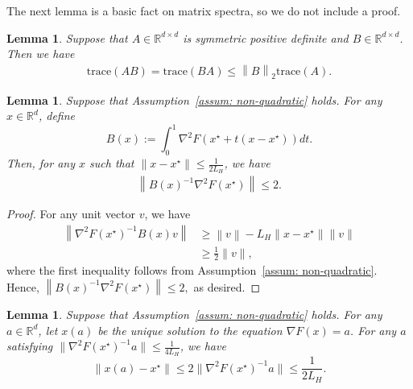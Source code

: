 \documentclass[11pt,twoside]{article}
\numberwithin{equation}{section}
\newcommand{\norm}[1] {\left \| #1 \right \|}
\newcommand{\trace}[1]{\mathrm{trace}\left(#1\right)}
\newcommand{\RR}{\mathbb{R}}
\newcommand{\1}{\mathbf{1}}
\newtheorem{lemma}[theorem]{Lemma}
\theoremstyle{remark}
\theoremstyle{plain}
\newcommand{\liph}{L_H}
\begin{document}
The next lemma is a basic fact on matrix spectra, so we do not include a proof.    \begin{lemma}\label{lem:trace_bound_opnorm}
	Suppose that $A \in \RR^{d\times d}$ is symmetric positive definite and $B \in \RR^{d\times d}$. Then we have
	\begin{align*}
		\trace{AB} = \trace{BA} \le \norm{B}_2\trace{A}.
	\end{align*}
\end{lemma}


\begin{lemma}\label{lem:optimal_trace_when_close}
	Suppose that Assumption~\ref{assum: non-quadratic} holds.  For any $x \in \RR^d$, define 
	$$
	B(x) := \int_{0}^{1} \nabla^2 F(x^\star + t( x - x^\star)) dt.
	$$ 
	Then, for any $x$ such that $\|x -x^\star\| \le  \frac{1}{2\liph}$, we have 
	\begin{align*}
		\norm{B(x)^{-1} \nabla^2 F(x^\star)} \le 2.
	\end{align*}
\end{lemma}
\begin{proof}
	For any unit vector $v$, we have
	\begin{align*}
		\norm{\nabla^2 F(x^\star)^{-1} B(x) v} &\ge \norm{v} - \liph\|x -x^\star\| \|v\|\\
		&\ge \frac{1}{2} \|v\|,
	\end{align*}
	where the first inequality follows from Assumption~\ref{assum: non-quadratic}.
	Hence, $\norm{B(x)^{-1} \nabla^2 F(x^\star)} \le 2,$ as desired.
\end{proof}




\begin{lemma}\label{lem:small_noise_close_solution}
	Suppose that Assumption~\ref{assum: non-quadratic} holds.  For any $a \in \RR^d$, let $x(a)$ be the unique solution to the equation $\nabla F(x) = a$. For any $a$ satisfying $\|\nabla^2 F(x^\star)^{-1} a \| \le \frac{1}{4\liph}$, we have 
	$$
	\|x(a) - x^\star\| \le 2\|\nabla^2 F(x^\star)^{-1} a\| \le \frac{1}{2\liph}.
	$$
\end{lemma}
\end{document}
